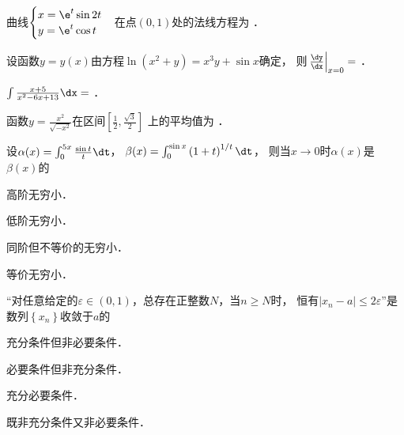 \documentclass[plain,noanswer,medmath]{../../template/jnuexam}
\begin{document}






\begin{problem}
曲线$\begin{cases}
  x = \e^t\sin 2t \\
  y = \e^t\cos t \\
\end{cases}$在点$(0,1)$处的法线方程为 \fillin{}．
\end{problem}


\begin{problem}
设函数$y = y(x)$由方程$\ln \left(x^2 + y \right) = x^3 y + \sin x$确定，
则$\left. \frac{\dy}{\dx} \right|_{x = 0} =$ \fillin{}．
\end{problem}


\begin{problem}
$\int \frac{x + 5}{x^2 - 6x + 13} \dx =$ \fillin{}．
\end{problem}


\begin{problem}
函数$y = \frac{x^2}{\sqrt{- x^2}}$在区间$\left[\frac{1}{2},\frac{\sqrt{3}}{2} \right]$
上的平均值为 \fillin{}．
\end{problem}








\begin{problem}
设$\alpha (x) = \int_0^{5x} \frac{\sin t}{t}\dt$，
$\beta (x) = \int_0^{\sin x} \left(1 + t \right)^{1/t} \dt$，
则当$x \to 0$时$\alpha (x)$是$\beta (x)$的\pickout{}
\begin{abcd}
\item 高阶无穷小．
\item 低阶无穷小．
\item 同阶但不等价的无穷小．
\item 等价无穷小．
\end{abcd}
\end{problem}




\begin{problem}
“对任意给定的$\varepsilon \in \left(0, 1 \right)$，总存在正整数$N$，当$n \ge N$时，
恒有$\left| x_n - a \right| \le 2\varepsilon$”是数列$\left\{x_n \right\}$收敛于$a$的\pickout{}
\begin{abcd}
\item 充分条件但非必要条件．
\item 必要条件但非充分条件．
\item 充分必要条件．
\item 既非充分条件又非必要条件．
\end{abcd}
\end{problem}
\end{document}
